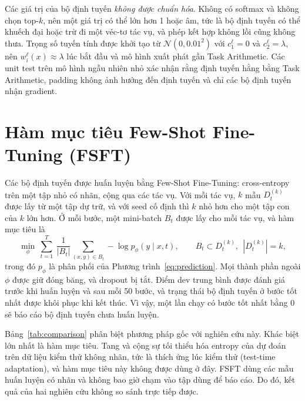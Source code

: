 Các giá trị của bộ định tuyến \emph{không được chuẩn hóa}. Không có softmax và không chọn top-$k$, nên một giá trị có thể lớn hơn 1 hoặc âm, tức là bộ định tuyến có thể khuếch đại hoặc trừ đi một véc-tơ tác vụ, và phép kết hợp không lồi cũng không thưa. Trọng số tuyến tính được khởi tạo từ $\mathcal{N}(0,0.01^2)$ với $c^{\ell}_1=0$ và $c^{\ell}_2=\lambda$, nên $w^{\ell}_i(x)\approx\lambda$ lúc bắt đầu và mô hình xuất phát gần Task Arithmetic. Các unit test trên mô hình ngẫu nhiên nhỏ xác nhận rằng định tuyến hằng bằng Task Arithmetic, padding không ảnh hưởng đến định tuyến và chỉ các bộ định tuyến nhận gradient.

\section{Hàm mục tiêu Few-Shot Fine-Tuning (FSFT)}
\label{sec:fsft}

Các bộ định tuyến được huấn luyện bằng Few-Shot Fine-Tuning: cross-entropy trên một tập nhỏ có nhãn, cộng qua các tác vụ. Với mỗi tác vụ, $k$ mẫu $D_t^{(k)}$ được lấy từ một tập dự trữ, và với seed cố định thì $k$ nhỏ hơn cho một tập con của $k$ lớn hơn. Ở mỗi bước, một mini-batch $B_t$ được lấy cho mỗi tác vụ, và hàm mục tiêu là
\begin{equation}
\min_{\phi}\ \sum_{t=1}^{T}\ \frac{1}{|B_t|}\sum_{(x,y)\in B_t}-\log p_{\phi}(y\mid x,t),
\qquad B_t\subset D_t^{(k)},\ \ |D_t^{(k)}|=k ,
\label{eq:fsft}
\end{equation}
trong đó $p_\phi$ là phân phối của Phương trình~\eqref{eq:prediction}. Mọi thành phần ngoài $\phi$ được giữ đóng băng, và dropout bị tắt. Điểm dev trung bình được đánh giá trước khi huấn luyện và sau mỗi 50 bước, và trạng thái bộ định tuyến ở bước tốt nhất được khôi phục khi kết thúc. Vì vậy, một lần chạy có bước tốt nhất bằng 0 sẽ báo cáo bộ định tuyến chưa huấn luyện.

Bảng~\ref{tab:comparison} phân biệt phương pháp gốc với nghiên cứu này. Khác biệt lớn nhất là hàm mục tiêu. Tang và cộng sự tối thiểu hóa entropy của dự đoán trên dữ liệu kiểm thử không nhãn, tức là thích ứng lúc kiểm thử (test-time adaptation), và hàm mục tiêu này không được dùng ở đây. FSFT dùng các mẫu huấn luyện có nhãn và không bao giờ chạm vào tập dùng để báo cáo. Do đó, kết quả của hai nghiên cứu không so sánh trực tiếp được.

